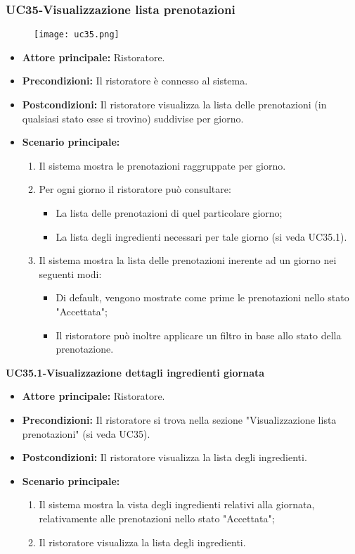 \subsubsection{UC35-Visualizzazione lista prenotazioni}
\begin{figure}[h] \texttt{[image: uc35.png]} \end{figure}
\begin{itemize}
\item \textbf{Attore principale:} Ristoratore.
\item \textbf{Precondizioni:} Il ristoratore è connesso al sistema.
\item \textbf{Postcondizioni:} Il ristoratore visualizza la lista delle prenotazioni (in qualsiasi stato esse si trovino) suddivise per giorno.
\item \textbf{Scenario principale:}
\begin{enumerate}
    \item Il sistema mostra le prenotazioni raggruppate per giorno.
    \item Per ogni giorno il ristoratore può consultare:
    \begin{itemize}
        \item La lista delle prenotazioni di quel particolare giorno;
        \item La lista degli ingredienti necessari per tale giorno (si veda UC35.1).
    \end{itemize}
    \item Il sistema mostra la lista delle prenotazioni inerente ad un giorno nei seguenti modi:
    \begin{itemize}
        \item Di default, vengono mostrate come prime le prenotazioni nello stato "Accettata";
        \item Il ristoratore può inoltre applicare un filtro in base allo stato della prenotazione.
    \end{itemize}
\end{enumerate}
\end{itemize}

\textbf{UC35.1-Visualizzazione dettagli ingredienti giornata}
\begin{itemize}
\item \textbf{Attore principale:} Ristoratore.
\item \textbf{Precondizioni:} Il ristoratore si trova nella sezione "Visualizzazione lista prenotazioni" (si veda UC35).
\item \textbf{Postcondizioni:} Il ristoratore visualizza la lista degli ingredienti.
\item \textbf{Scenario principale:}
\begin{enumerate}
    \item Il sistema mostra la vista degli ingredienti relativi alla giornata, relativamente alle prenotazioni nello stato "Accettata";
    \item Il ristoratore visualizza la lista degli ingredienti.
\end{enumerate}
\end{itemize}

